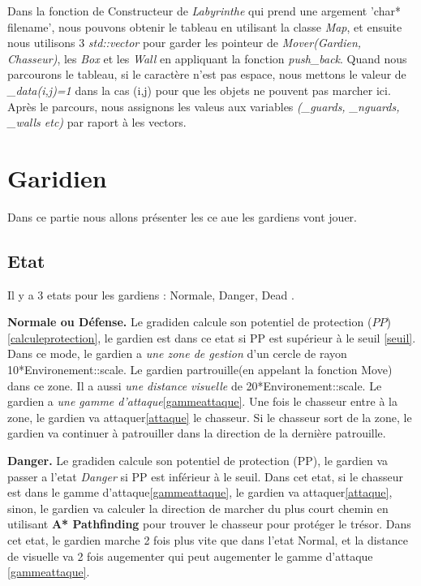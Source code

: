 \documentclass{article}
\begin{document}
Dans la fonction de Constructeur de \textsl{Labyrinthe} qui prend une argement 'char* filename', nous pouvons obtenir le tableau en utilisant la classe \textsl{Map}, et ensuite nous utilisons 3 \textsl{std::vector} pour garder les pointeur de \textsl{Mover(Gardien, Chasseur)}, les \textsl{Box} et les \textsl{Wall} en appliquant la fonction \textsl{push\_back}. Quand nous parcourons le tableau, si le caractère n'est pas espace, nous mettons le valeur de \textsl{\_data(i,j)=1} dans la cas (i,j) pour que les objets ne pouvent pas marcher ici. Après le parcours, nous assignons les valeus aux variables \textsl{(\_guards, \_nguards, \_walls etc)} par raport à les vectors.

\section{Garidien}
Dans ce partie nous allons présenter les ce aue les gardiens vont jouer.
\subsection{Etat}
Il y a 3 etats pour les gardiens : Normale, Danger, Dead . 

\textbf{Normale ou Défense.} Le gradiden  calcule son potentiel de protection ($PP$) \ref{calculeprotection}, le gardien est dans ce etat si PP est supérieur à le seuil \ref{seuil}. Dans ce mode, le gardien a \textsl{une zone de gestion} d'un cercle de rayon 10*Environement::scale. Le gardien partrouille(en appelant la fonction Move) dans ce zone. Il a aussi \textsl{une distance visuelle} de 20*Environement::scale. Le gardien a \textsl{une gamme d'attaque}\ref{gammeattaque}. Une fois le chasseur entre à la zone, le gardien va attaquer\ref{attaque} le chasseur. Si le chasseur sort de la zone, le gardien va continuer à patrouiller dans la direction de la dernière patrouille. 

\textbf{Danger.} Le gradiden  calcule son potentiel de protection (PP), le gardien va passer a l'etat \textsl{Danger} si PP est inférieur à le seuil. Dans cet etat, si le chasseur est dans le gamme d'attaque\ref{gammeattaque}, le gardien va attaquer\ref{attaque}, sinon, le gardien va calculer la direction de marcher du plus court chemin en utilisant \textbf{A* Pathfinding} pour trouver le chasseur pour protéger le trésor. Dans cet etat, le gardien marche 2 fois plus vite que dans l'etat Normal, et la distance de visuelle va 2 fois augementer qui peut augementer le gamme d'attaque \ref{gammeattaque}. 
\end{document}
